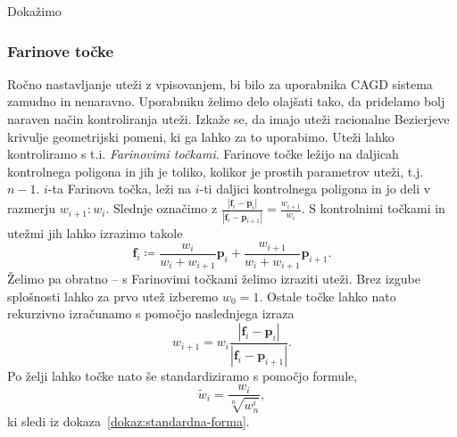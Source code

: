 \documentclass[isrm2, tisk]{fmfdelo}
\newcommand{\p}{\textbf{p}}
\begin{document}
    Dokažimo

    \subsubsection{Farinove točke}
    Ročno nastavljanje uteži z vpisovanjem, bi bilo za uporabnika CAGD sistema zamudno in nenaravno.
    Uporabniku želimo delo olajšati tako, da pridelamo bolj naraven način kontroliranja uteži.
    Izkaže se, da imajo uteži racionalne Bezierjeve krivulje geometrijski pomeni, ki ga lahko za to uporabimo.
    Uteži lahko kontroliramo s t.i. \textit{Farinovimi točkami}.
    Farinove točke ležijo na daljicah kontrolnega poligona in jih je toliko, kolikor je prostih parametrov uteži, t.j.\ $n-1$.
    $i$-ta Farinova točka, leži na $i$-ti daljici kontrolnega poligona in jo deli v razmerju $w_{i+1}:w_{i}$.
    Slednje označimo z $\frac{|\mathbf{f}_i-\p_i|}{|\mathbf{f}_i-\p_{i+1}|} = \frac{w_{i+1}}{w_{i}}$.
    S kontrolnimi točkami in utežmi jih lahko izrazimo takole
    \[\mathbf{f}_i \coloneqq \frac{w_{i}}{w_{i}+w_{i+1}}\p_i +  \frac{w_{i+1}}{w_{i}+w_{i+1}}\p_{i+1}.\]
    Želimo pa obratno – s Farinovimi točkami želimo izraziti uteži.
    Brez izgube splošnosti lahko za prvo utež izberemo $w_0=1$.
    Ostale točke lahko nato rekurzivno izračunamo s pomočjo naslednjega izraza
    \[w_{i+1} = w_i\frac{|\mathbf{f}_i-\p_i|}{|\mathbf{f}_i-\p_{i+1}|}.\]
    Po želji lahko točke nato še standardiziramo s pomočjo formule,\[\tilde{w}_{i} = \frac{w_i}{\sqrt[n]{w_n^i}},\]
    ki sledi iz dokaza~\ref{dokaz:standardna-forma}.
\end{document}
